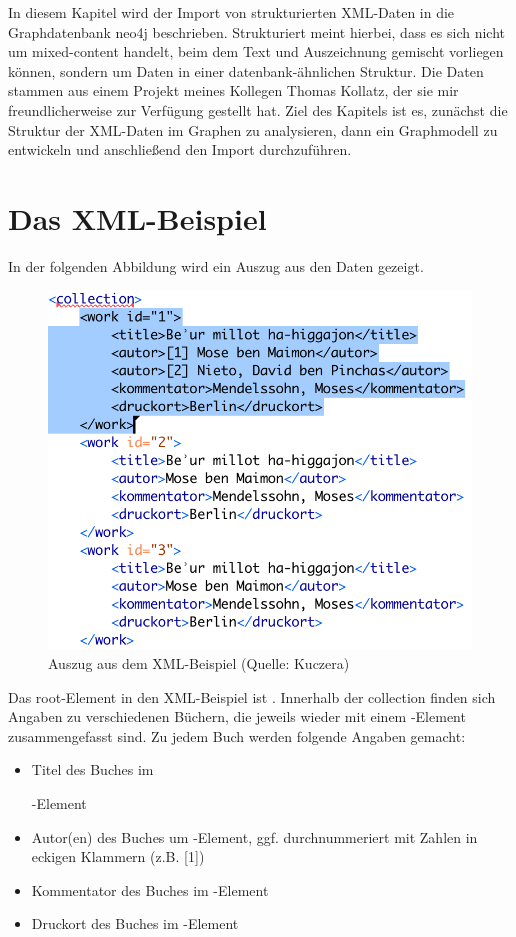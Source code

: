 \documentclass[ngerman,]{scrreprt}
\providecommand{\tightlist}{%
  \setlength{\itemsep}{0pt}\setlength{\parskip}{0pt}}
\begin{document}
In diesem Kapitel wird der Import von strukturierten XML-Daten in die Graphdatenbank neo4j beschrieben. Strukturiert meint hierbei, dass es sich nicht um mixed-content handelt, beim dem Text und Auszeichnung gemischt vorliegen können, sondern um Daten in einer datenbank-ähnlichen Struktur. Die Daten stammen aus einem Projekt meines Kollegen Thomas Kollatz, der sie mir freundlicherweise zur Verfügung gestellt hat. Ziel des Kapitels ist es, zunächst die Struktur der XML-Daten im Graphen zu analysieren, dann ein Graphmodell zu entwickeln und anschließend den Import durchzuführen.

\section{Das XML-Beispiel}\label{das-xml-beispiel}

In der folgenden Abbildung wird ein Auszug aus den Daten gezeigt.

\begin{figure}
\centering
\includegraphics{./Bilder/kollatz-xml-Beispiel.png}
\caption{Auszug aus dem XML-Beispiel (Quelle: Kuczera)}
\end{figure}

Das root-Element in den XML-Beispiel ist . Innerhalb der collection finden sich Angaben zu verschiedenen Büchern, die jeweils wieder mit einem -Element zusammengefasst sind. Zu jedem Buch werden folgende Angaben gemacht:

\begin{itemize}
\tightlist
\item
  Titel des Buches im

  -Element
\item
  Autor(en) des Buches um -Element, ggf. durchnummeriert mit Zahlen in eckigen Klammern (z.B. {[}1{]})
\item
  Kommentator des Buches im -Element
\item
  Druckort des Buches im -Element
\end{itemize}
\end{document}
